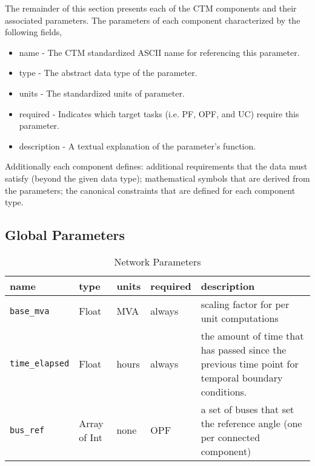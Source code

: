 \documentclass{article}
\begin{document}
The remainder of this section presents each of the CTM components and their associated parameters.  The parameters of each component characterized by the following fields,
%
\begin{itemize}
    \item name - The CTM standardized ASCII name for referencing this parameter.
    \item type - The abstract data type of the parameter.
    \item units - The standardized units of parameter.
    \item required - Indicates which target tasks (i.e. PF, OPF, and UC) require this parameter.
    \item description - A textual explanation of the parameter's function.
\end{itemize}
%
Additionally each component defines: additional requirements that the data must satisfy (beyond the given data type); mathematical symbols that are derived from the parameters; the canonical constraints that are defined for each component type.


\subsection{Global Parameters}

\begin{table}[h]
\centering
\caption{Network Parameters}
\begin{tabular}{|l|l|l|l|p{7cm}|}
\hline
name & type & units & required & description \\ 
\hline
\hline
\texttt{base\_mva} & Float & MVA & always & scaling factor for per unit computations \\ 
\hline
\texttt{time\_elapsed} & Float & hours & always & the amount of time that has passed since the previous time point for temporal boundary conditions.\\ 
\hline
\texttt{bus\_ref} & Array of Int & none & OPF & a set of buses that set the reference angle (one per connected component) \\ 
\hline
\end{tabular}
\label{tbl:universal}
\end{table}
\end{document}
